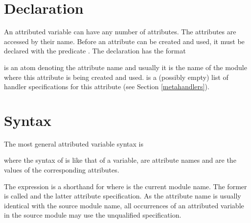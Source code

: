 \section{Declaration}
An attributed variable can have any number of attributes.
The attributes are accessed by their name.
Before an attribute can be created and used, it must be declared
with the predicate
.
The declaration has the format
\begin{quote}
\end{quote}
 is an atom denoting the attribute name
and usually it is the name of the module where this attribute
is being created and used.
 is a (possibly empty) list of handler specifications
for this attribute (see Section \ref{metahandlers}).

\vfill %

\section{Syntax}

{\samepage
The most general attributed variable syntax is
\begin{quote}
\end{quote}
where the syntax of  is like that of a variable,
are attribute names and
are the values of the corresponding attributes.
}
The expression  is a shorthand for
 where  is the current
module name.
The former is called  and the latter
 attribute specification.
As the attribute name is usually identical with the source module name,
all occurrences of an attributed variable in the source module may use the
unqualified
specification.

